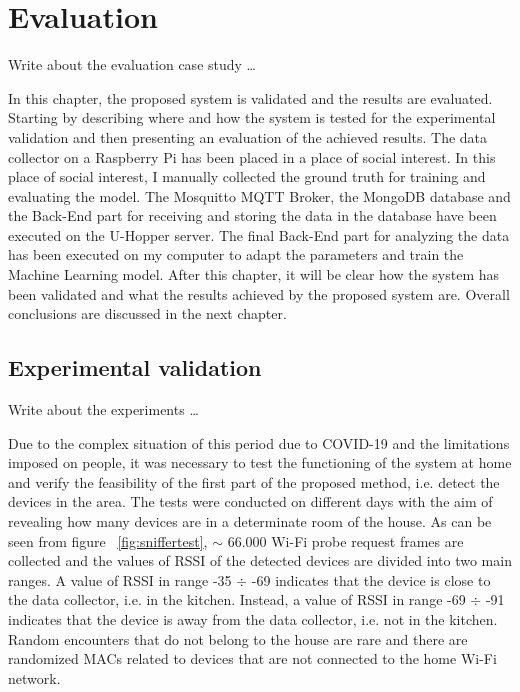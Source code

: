 \chapter{Evaluation}
\label{cha:evaluation}
\vspace{0.4 cm} 

Write about the evaluation case study \dots

In this chapter, the proposed system is validated and the results are evaluated.
Starting by describing where and how the system is tested for the experimental validation and then presenting an evaluation of the achieved results. The data collector on a Raspberry Pi has been placed in a place of social interest. In this place of social interest, I manually collected the ground truth for training and evaluating the model. The Mosquitto MQTT Broker, the MongoDB database and the Back-End part for receiving and storing the data in the database have been executed on the U-Hopper server. The final Back-End part for analyzing the data has been executed on my computer to adapt the parameters and train the Machine Learning model. After this chapter, it will be clear how the system has been validated and what the results achieved by the proposed system are. Overall conclusions are discussed in the next chapter.


\section{Experimental validation}
\label{sec:expval}
\vspace{0.2 cm} 

Write about the experiments \dots

Due to the complex situation of this period due to COVID-19 and the limitations imposed on people, it was necessary to test the functioning of the system at home and verify the feasibility of the first part of the proposed method, i.e. detect the devices in the area. The tests were conducted on different days with the aim of revealing how many devices are in a determinate room of the house. As can be seen from figure ~\ref{fig:sniffertest}, $\sim$ 66.000 Wi-Fi probe request frames are collected and the values of RSSI of the detected devices are divided into two main ranges. A value of RSSI in range -35 $\div$ -69 indicates that the device is close to the data collector, i.e. in the kitchen. Instead, a value of RSSI in range -69 $\div$ -91 indicates that the device is away from the data collector, i.e. not in the kitchen. Random encounters that do not belong to the house are rare and there are randomized MACs related to devices that are not connected to the home Wi-Fi network.

